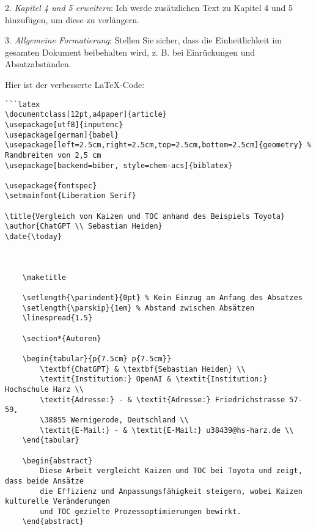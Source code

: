 2. \textit{Kapitel 4 und 5 erweitern}: Ich werde zusätzlichen Text zu Kapitel 4 und 5 hinzufügen, um diese zu verlängern.

3. \textit{Allgemeine Formatierung}: Stellen Sie sicher, dass die Einheitlichkeit im gesamten Dokument beibehalten wird, z. B. bei Einrückungen und Absatzabständen.

Hier ist der verbesserte LaTeX-Code:

\begin{verbatim}
```latex
\documentclass[12pt,a4paper]{article}
\usepackage[utf8]{inputenc}
\usepackage[german]{babel}
\usepackage[left=2.5cm,right=2.5cm,top=2.5cm,bottom=2.5cm]{geometry} % Randbreiten von 2,5 cm
\usepackage[backend=biber, style=chem-acs]{biblatex}

\usepackage{fontspec}
\setmainfont{Liberation Serif}

\title{Vergleich von Kaizen und TOC anhand des Beispiels Toyota}
\author{ChatGPT \\ Sebastian Heiden}
\date{\today}


	
	\maketitle
	
	\setlength{\parindent}{0pt} % Kein Einzug am Anfang des Absatzes
	\setlength{\parskip}{1em} % Abstand zwischen Absätzen
	\linespread{1.5}
	
	\section*{Autoren}
	
	\begin{tabular}{p{7.5cm} p{7.5cm}}
		\textbf{ChatGPT} & \textbf{Sebastian Heiden} \\
		\textit{Institution:} OpenAI & \textit{Institution:} Hochschule Harz \\
		\textit{Adresse:} - & \textit{Adresse:} Friedrichstrasse 57-59, 
		\38855 Wernigerode, Deutschland \\
		\textit{E-Mail:} - & \textit{E-Mail:} u38439@hs-harz.de \\
	\end{tabular}
	
	\begin{abstract}
		Diese Arbeit vergleicht Kaizen und TOC bei Toyota und zeigt, dass beide Ansätze 
		die Effizienz und Anpassungsfähigkeit steigern, wobei Kaizen kulturelle Veränderungen 
		und TOC gezielte Prozessoptimierungen bewirkt.
	\end{abstract}
	

\end{verbatim}
